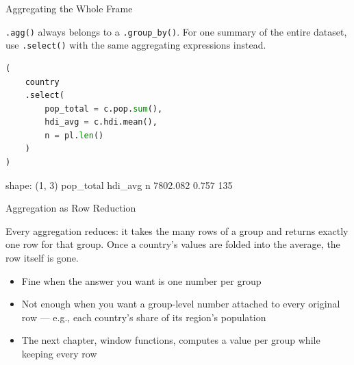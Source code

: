 \documentclass[8pt,aspectratio=169]{beamer}
\begin{document}
\begin{frame}[fragile]{Aggregating the Whole Frame}
\begin{splitcode}{%

\texttt{.agg()} always belongs to a \texttt{.group\_by()}. For one summary of the entire dataset, use \texttt{.select()} with the same aggregating expressions instead.

}
\begin{lstlisting}[language=Python]
(
    country
    .select(
        pop_total = c.pop.sum(),
        hdi_avg = c.hdi.mean(),
        n = pl.len()
    )
)
\end{lstlisting}
\begin{codeoutput}
shape: (1, 3)
pop_total  hdi_avg  n
7802.082   0.757    135
\end{codeoutput}
\end{splitcode}
\end{frame}

\begin{textframe}{Aggregation as Row Reduction}

Every aggregation reduces: it takes the many rows of a group and returns exactly one row for that group. Once a country's values are folded into the average, the row itself is gone.

\begin{itemize}
\item Fine when the answer you want is one number per group
\item Not enough when you want a group-level number attached to every original row --- e.g., each country's share of its region's population
\item The next chapter, window functions, computes a value per group while keeping every row
\end{itemize}

\end{textframe}
\end{document}
